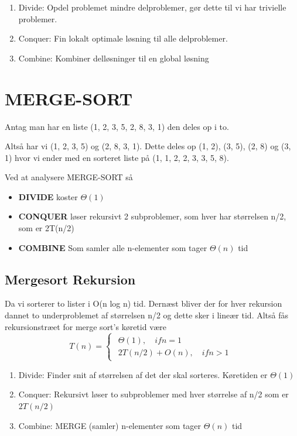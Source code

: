 \documentclass[11pt,a4paper]{report}
\theoremstyle{plain}
\theoremstyle{definition}
\theoremstyle{remark}
\numberwithin{equation}{section}
\begin{document}
\begin{enumerate}
  \item Divide: Opdel problemet mindre delproblemer, gør dette til vi har trivielle problemer.
  \item Conquer: Fin lokalt optimale løsning til alle delproblemer.
  \item Combine: Kombiner delløsninger til en global løsning
\end{enumerate}

\section{MERGE-SORT}

Antag man har en liste (1, 2, 3, 5, 2, 8, 3, 1) den deles op i to.


Altså har vi (1, 2, 3, 5) og (2, 8, 3, 1). Dette deles op (1, 2), (3, 5), (2, 8) og (3, 1) hvor vi ender med en sorteret liste på (1, 1, 2, 2, 3, 3, 5, 8).

Ved at analysere MERGE-SORT så
\begin{itemize}
  \item \textbf{DIVIDE} koster $\Theta(1)$
  \item \textbf{CONQUER} løser rekursivt 2 subproblemer, som hver har størrelsen n/2, som er 2T(n/2)
  \item \textbf{COMBINE} Som samler alle n-elementer som tager $\Theta(n)$ tid
\end{itemize}

\subsection{Mergesort Rekursion}
Da vi sorterer to lister i O(n log n) tid. Dernæst bliver der for hver rekursion dannet to underproblemet af størrelsen n/2 og dette sker i lineær tid. Altså fås rekursionstræet for merge sort's køretid være
\[
T(n) =  \begin{cases}
              \begin{array}{c}
                \Theta(1), \quad if n = 1 \\
                2T(n/2) + O(n), \quad if n > 1
              \end{array}
              \end{cases}
\]
\begin{enumerate}
  \item Divide: Finder snit af størrelsen af det der skal sorteres. Køretiden er $\Theta(1)$
  \item Conquer: Rekursivt løser to subproblemer med hver størrelse af n/2 som er $2T(n/2)$
  \item Combine: MERGE (samler) n-elementer som tager $\Theta(n)$ tid
\end{enumerate}
\end{document}
